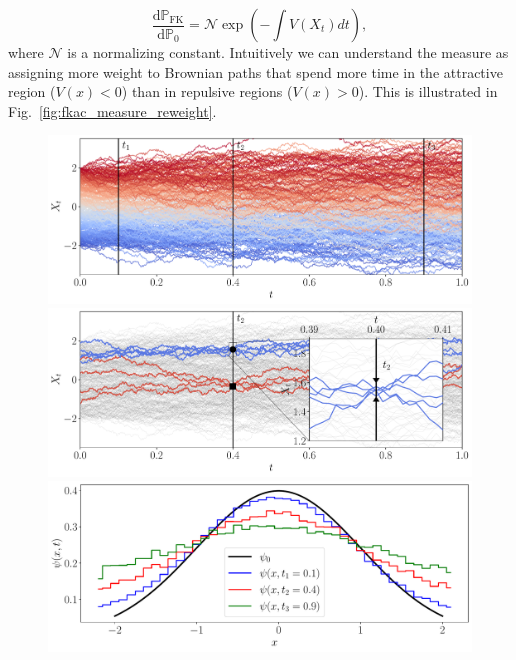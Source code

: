 \begin{equation}
\label{eq:RNderiv}
\frac{\mathrm{d} \mathbb{P}_{\mathrm{FK}}}{\mathrm{d} \mathbb{P}_{0}}=\mathcal{N} \exp \left(-\int V\left(X_{t}\right) d t\right),
\end{equation}
where $\mathcal{N}$ is a normalizing constant. Intuitively we can understand the measure as assigning more weight to Brownian paths that spend more time in the attractive region ($V(x) < 0$) than in repulsive regions ($V(x) > 0$). This is illustrated in Fig.~\ref{fig:fkac_measure_reweight}. 
\begin{figure}[H]
	\centering
	\subfloat
	{\includegraphics[width = \linewidth]{Chapter3/Figs/Raster/fkac_vs_fplanck_top.pdf}} \\
	\subfloat
	{\includegraphics[width = \linewidth]{Chapter3/Figs/Raster/fkac_vs_fplanck_mid1.pdf}} \\
	\subfloat
	{\includegraphics[width = \linewidth]{Chapter3/Figs/Raster/fkac_vs_fplanck_bottom.pdf}}
	

\end{figure}
